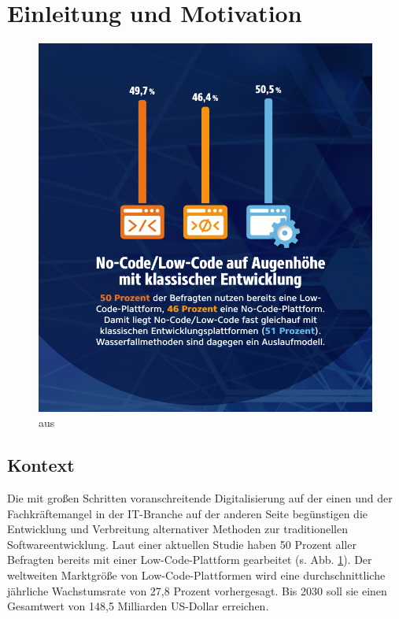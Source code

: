 \documentclass[acmtog, language=ngerman]{acmart}
\begin{document}
\maketitle

\section{Einleitung und Motivation}

\begin{figure}[h]
    \centering
    \includegraphics[width=1\linewidth]{images/studie-low-code-cropped.pdf}
    \caption{aus \cite{studie_low_code}}
    \label{fig:low_code_no_code}
\end{figure}
\subsection{Kontext}
Die mit großen Schritten voranschreitende Digitalisierung auf der einen und der Fachkräftemangel in der IT-Branche auf der anderen Seite begünstigen die Entwicklung und Verbreitung alternativer Methoden zur traditionellen Softwareentwicklung. \cite{flake_fachkraeftemangel_2023} Laut einer aktuellen Studie haben 50 Prozent aller Befragten bereits mit einer Low-Code-Plattform gearbeitet (s. Abb. \ref{fig:low_code_no_code}). Der weltweiten Marktgröße von Low-Code-Plattformen wird eine durchschnittliche jährliche Wachstumsrate von 27,8 Prozent vorhergesagt. Bis 2030 soll sie einen Gesamtwert von 148,5 Milliarden US-Dollar erreichen. \cite{straits_low_code_development_platform_market_2021} 
\end{document}
